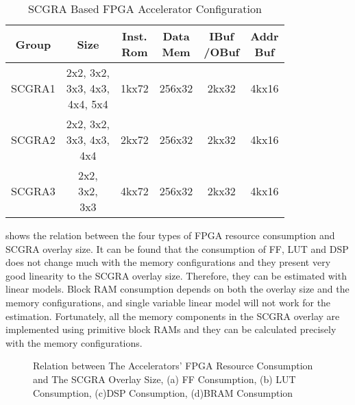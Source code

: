 \begin{table}[htb]
    \footnotesize
    \centering
    \caption{SCGRA Based FPGA Accelerator Configuration \label{tab:config}}{
        \begin{tabular}{c|c|c|c|c|c}
            \hline
            Group & Size & \tabincell{c}{Inst. \\ Rom} & 
            \tabincell{c}{Data \\ Mem} & \tabincell{c}{IBuf \\ /OBuf} & 
            \tabincell{c}{Addr \\Buf} \\ \hline

            SCGRA1 & \tabincell{l}{2x2, 3x2, \\ 3x3, 4x3, \\ 4x4, 5x4} & 
            1kx72 & 256x32 & 2kx32 & 4kx16\\ \hline

            SCGRA2 & \tabincell{l}{2x2, 3x2, \\ 3x3, 4x3, \\4x4} & 
            2kx72 & 256x32 & 2kx32 & 4kx16\\ \hline

            SCGRA3 & \tabincell{l}{2x2, \\ 3x2, \\ 3x3 } &  
            4kx72 & 256x32 & 2kx32 & 4kx16\\ \hline
        \end{tabular}
    }
\end{table}

 shows the relation between the four types of FPGA resource consumption and SCGRA overlay size. It can be found that the consumption of FF, LUT and DSP does not change much with the memory configurations and they present very good linearity to the SCGRA overlay size. Therefore, they can be estimated with linear models. Block RAM consumption depends on both the overlay size and the memory configurations, and single variable linear model will not work for the estimation. Fortunately, all the memory components in the SCGRA overlay are implemented using primitive block RAMs and they can be calculated precisely with the memory configurations. 

\begin{figure}[tb]
\centering
    \hfill
    \caption{Relation between The Accelerators' FPGA Resource Consumption and The SCGRA Overlay Size, 
    (a) FF Consumption, (b) LUT Consumption, (c)DSP Consumption, (d)BRAM Consumption}
    \label{fig:SCGRA-Overhead}
\end{figure}

